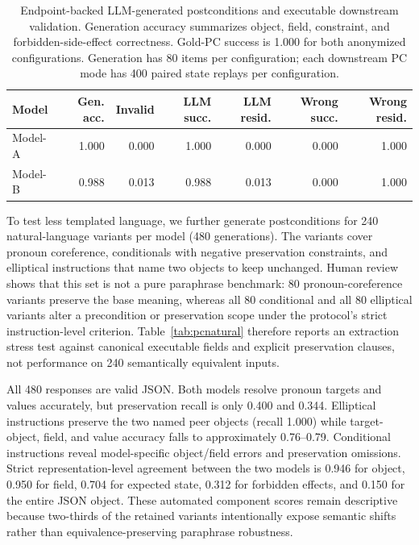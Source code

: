 \documentclass[pdflatex,sn-apa]{sn-jnl}
\begin{document}
\begin{table}[htbp]
\centering
\caption{Endpoint-backed LLM-generated postconditions and executable downstream validation. Generation accuracy summarizes object, field, constraint, and forbidden-side-effect correctness. Gold-PC success is 1.000 for both anonymized configurations. Generation has 80 items per configuration; each downstream PC mode has 400 paired state replays per configuration.}
\label{tab:pcgen}
\scriptsize
\setlength{\tabcolsep}{2.2pt}
\begin{tabular}{lrrrrrr}
\toprule
Model & Gen. acc. & Invalid & LLM succ. & LLM resid. & Wrong succ. & Wrong resid. \\
\midrule
Model-A & 1.000 & 0.000 & 1.000 & 0.000 & 0.000 & 1.000 \\
Model-B & 0.988 & 0.013 & 0.988 & 0.013 & 0.000 & 1.000 \\
\bottomrule
\end{tabular}
\end{table}

To test less templated language, we further generate postconditions for 240 natural-language variants per model (480 generations). The variants cover pronoun coreference, conditionals with negative preservation constraints, and elliptical instructions that name two objects to keep unchanged. Human review shows that this set is not a pure paraphrase benchmark: 80 pronoun-coreference variants preserve the base meaning, whereas all 80 conditional and all 80 elliptical variants alter a precondition or preservation scope under the protocol's strict instruction-level criterion. Table~\ref{tab:pcnatural} therefore reports an extraction stress test against canonical executable fields and explicit preservation clauses, not performance on 240 semantically equivalent inputs.

All 480 responses are valid JSON. Both models resolve pronoun targets and values accurately, but preservation recall is only 0.400 and 0.344. Elliptical instructions preserve the two named peer objects (recall 1.000) while target-object, field, and value accuracy falls to approximately 0.76--0.79. Conditional instructions reveal model-specific object/field errors and preservation omissions. Strict representation-level agreement between the two models is 0.946 for object, 0.950 for field, 0.704 for expected state, 0.312 for forbidden effects, and 0.150 for the entire JSON object. These automated component scores remain descriptive because two-thirds of the retained variants intentionally expose semantic shifts rather than equivalence-preserving paraphrase robustness.
\end{document}

